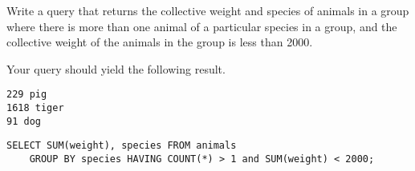 \begin{blocksection}
\question Write a query that returns the collective weight and species of animals in a group where there is more than one animal of a particular species in a group, and the collective weight of the animals in the group is less than 2000.

Your query should yield the following result.

\begin{lstlisting}
229 pig
1618 tiger
91 dog
\end{lstlisting}

\begin{solution}[1.5in]
\begin{lstlisting}
SELECT SUM(weight), species FROM animals
    GROUP BY species HAVING COUNT(*) > 1 and SUM(weight) < 2000;
\end{lstlisting}
\end{solution}
\end{blocksection}
